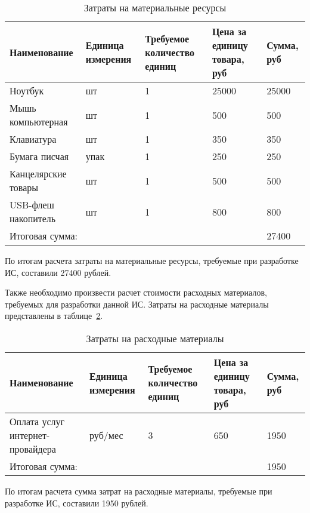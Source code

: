 \begin{myTable}
\begin{longtable}[h]{|p{}|p{}|p{}|p{}|p{}|}
	\caption{\label{tab:zatrat}Затраты на материальные ресурсы} \\
	\hline
		\textbf{Наименование} &
		\textbf{Единица измерения} &
		\textbf{Требуемое количество единиц} &
		\textbf{Цена за единицу товара, руб} &
		\textbf{Сумма, руб} \\
	\hline \endhead
		Ноутбук & шт & 1 & 25000 & 25000 \\ \hline
		Мышь компьютерная & шт & 1 & 500 & 500 \\ \hline
		Клавиатура & шт & 1 & 350 & 350 \\ \hline
		Бумага писчая & упак & 1 & 250 & 250 \\ \hline
		Канцелярские товары & шт & 1 & 500 & 500 \\ \hline
		USB-флеш накопитель & шт & 1 & 800 & 800 \\ \hline
		\multicolumn{4}{|l|}{Итоговая сумма:} & 27400 \\ \hline
\end{longtable}
\end{myTable}

По итогам расчета затраты на материальные ресурсы, требуемые при разработке ИС, составили 27400 рублей.

Также необходимо произвести расчет стоимости расходных материалов, требуемых для разработки данной ИС. Затраты на расходные материалы представлены в таблице~\ref{tab:zatrat_rash}.

\begin{myTable}
\begin{longtable}[h]{|p{}|p{}|p{}|p{}|p{}|}
	\caption{\label{tab:zatrat_rash}Затраты на расходные материалы} \\
	\hline
		\textbf{Наименование} &
		\textbf{Единица измерения} &
		\textbf{Требуемое количество единиц} &
		\textbf{Цена за единицу товара, руб} &
		\textbf{Сумма, руб} \\
	\hline
		Оплата услуг интернет-провайдера & руб/мес & 3 & 650 & 1950 \\ \hline
		\multicolumn{4}{|l|}{Итоговая сумма:} & 1950 \\ \hline
\end{longtable}
\end{myTable}

По итогам расчета сумма затрат на расходные материалы, требуемые при разработке ИС, составили 1950 рублей. 

